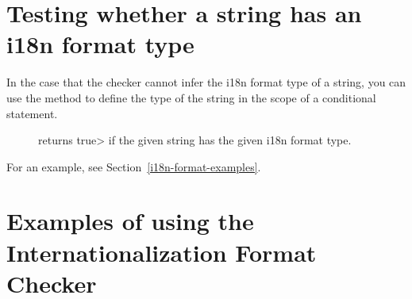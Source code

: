 \section{Testing whether a string has an i18n format type\label{i18n-format-testing}}

In the case that the checker cannot infer the i18n format type of a string,
you can use the 
method to define the type of the string in the scope of a conditional statement.

\begin{description}

\item[]
  returns \<true> if the given string has the given i18n format type.

\end{description}

\noindent For an example, see Section~\ref{i18n-format-examples}.


\section{Examples of using the Internationalization Format Checker\label{i18n-format-examples}}

